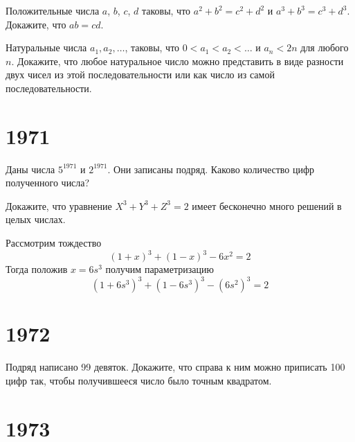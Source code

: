 \documentclass[11pt, a4paper]{problems_template}
\begin{document}
\begin{exercise}[22]
Положительные числа $a$, $b$, $c$, $d$ таковы, что $a^{2} + b^{2} = c^{2} + d^{2}$ и $a^{3} + b^{3} = c^{3} + d^{3}$. Докажите, что $ab = cd$.
\end{exercise}

\begin{Solution}

\end{Solution}


\begin{exercise}[34]
Натуральные числа $a_{1}, a_{2}, \dots$, таковы, что $0 < a_{1} < a_{2} < \dots$ и $a_{n} < 2n$ для любого $n$. Докажите, что любое натуральное число можно представить в виде разности двух чисел из этой последовательности или как число из самой последовательности.
\end{exercise}

\chapter{1971}

\begin{exercise}[14]
Даны числа $5^{1971}$ и $2^{1971}$. Они записаны подряд. Каково количество цифр полученного числа?
\end{exercise}

\begin{exercise}[37]
Докажите, что уравнение $X^{3} + Y^{3} + Z^{3} = 2$ имеет бесконечно много решений в целых числах.
\end{exercise}

\begin{Solution}
Рассмотрим тождество
$$
(1+x)^{3} + (1-x)^{3} - 6x^{2} = 2
$$
Тогда положив $x = 6s^{3}$ получим параметризацию
$$
(1+6s^{3})^{3} + (1-6s^{3})^{3} - (6s^{2})^{3} = 2
$$ 
\end{Solution}

\chapter{1972}

\begin{exercise}[33]
Подряд написано 99 девяток. Докажите, что справа к ним можно приписать 100 цифр так, чтобы получившееся число было точным квадратом.
\end{exercise}


\chapter{1973}
\end{document}
